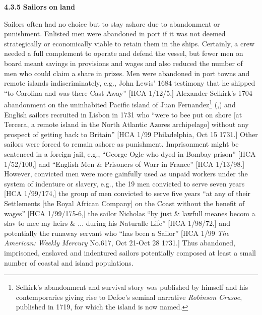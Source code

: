   \textbf{4.3.5} \textbf{Sailors} \textbf{on} \textbf{land}

Sailors often had no choice but to stay ashore due to abandonment or punishment. Enlisted men were abandoned in port if it was not deemed strategically or economically viable to retain them in the ships. Certainly, a crew needed a full complement to operate and defend the vessel, but fewer men on board meant savings in provisions and wages and also reduced the number of men who could claim a share in prizes. Men were abandoned in port towns and remote islands indiscriminately, e.g., John Lewis’ 1684 testimony that he shipped “to Carolina and was there Cast Away” [HCA 1/12/5,] Alexander Selkirk’s 1704 abandonment on the uninhabited Pacific island of Juan Fernandez\footnote{Selkirk’s abandonment and survival story was published by himself and his contemporaries giving rise to Defoe’s seminal narrative \textit{Robinson Crusoe}, published in 1719, for which the island is now named.}  (\citealt{Souhami2013},) and English sailors recruited in Lisbon in 1731 who “were to bee put on shore [at Tercera, a remote island in the North Atlantic Azores archipelago] without any prospect of getting back to Britain” [HCA 1/99 Philadelphia, Oct 15 1731.] Other sailors were forced to remain ashore as punishment. Imprisonment might be sentenced in a foreign jail, e.g., “George Ogle who dyed in Bombay prison” [HCA 1/52/100,] and “English Men \& Prisoners of Warr in France” [HCA 1/13/98.] However, convicted men were more gainfully used as unpaid workers under the system of indenture or slavery, e.g., the 19 men convicted to serve seven years [HCA 1/99/174,] the group of men convicted to serve five years “at any of their Settlements [the Royal African Company] on the Coast without the benefit of wages” [HCA 1/99/175-6,] the sailor Nicholas “by just \& lawfull meanes becom a slav to mee my heirs \& ... during his Naturalle Life” [HCA 1/98/72,] and potentially the runaway servant who “has been a Sailor” [HCA 1/99 \textit{The American: Weekly Mercury} No.617, Oct 21-Oct 28 1731.] Thus abandoned, imprisoned, enslaved and indentured sailors potentially composed at least a small number of coastal and island populations. 


